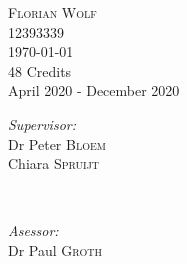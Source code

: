 \documentclass{article}
\begin{document}
\begin{titlepage}
\textsc{\Large Florian Wolf}\\[0.2cm] %

{12393339}\\[1cm]










{\Large \today}\\[1cm] %



{48 Credits}\\ %
{April 2020 - December 2020}\\[1cm]






\begin{minipage}[t]{0.4\textwidth}

\begin{flushleft} \large

\emph{Supervisor:} \\

Dr Peter \textsc{Bloem} \\ Chiara \textsc{Spruijt} %

\end{flushleft}

\end{minipage}

~

\begin{minipage}[t]{0.4\textwidth}

\begin{flushright} \large

\emph{Asessor:} \\

Dr Paul \textsc{Groth}\\


\end{flushright}
\end{minipage}
\end{titlepage}
\end{document}
